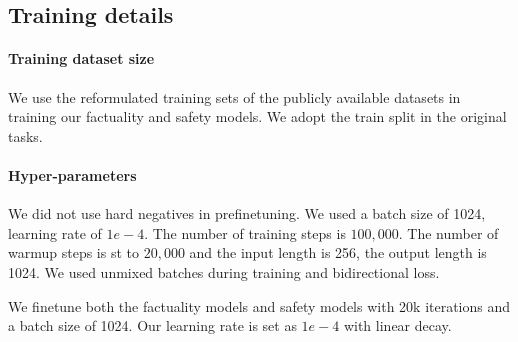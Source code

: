 
\subsection{Training details}
\paragraph{Training dataset size}
We use the reformulated training sets of the publicly available datasets in training our factuality and safety models. We adopt the train split in the original tasks. 

\paragraph{Hyper-parameters}

We did not use hard negatives in prefinetuning. We used a batch size of 1024, learning rate of $1e-4$. The number of training steps is $100,000$. The number of warmup steps is st to $20,000$ and the input length is 256, the output length is 1024. We used unmixed batches during training and bidirectional loss.

We finetune both the factuality models and safety models with 20k iterations and a batch size of 1024. Our learning rate is set as $1e-4$ with linear decay. 